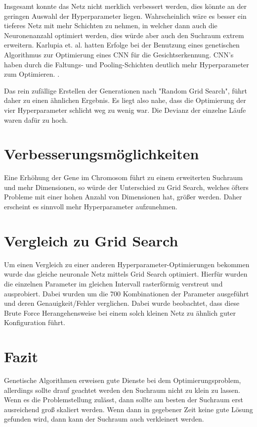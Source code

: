 Insgesamt konnte das Netz nicht merklich verbessert werden, dies könnte an der geringen Auswahl der Hyperparameter liegen. Wahrscheinlich wäre es besser ein tieferes Netz mit mehr Schichten zu nehmen, in welcher dann auch die Neuronenanzahl optimiert werden, dies würde aber auch den Suchraum extrem erweitern. Karlupia et. al. hatten Erfolge bei der Benutzung eines genetischen Algorithmus zur Optimierung eines CNN für die Gesichtserkennung. CNN's haben durch die Faltungs- und Pooling-Schichten deutlich mehr Hyperparameter zum Optimieren. \parencite{karlupia_genetic_2023}. 

Das rein zufällige Erstellen der Generationen nach "Random Grid Search", führt daher zu einen ähnlichen Ergebnis. Es liegt also nahe, dass die Optimierung der vier Hyperparameter schlicht weg zu wenig war. Die Devianz der einzelne Läufe waren dafür zu hoch.

\section{Verbesserungsmöglichkeiten}
Eine Erhöhung der Gene im Chromosom führt zu einem erweiterten Suchraum und mehr Dimensionen, so würde der Unterschied zu Grid Search, welches öfters Probleme mit einer hohen Anzahl von Dimensionen hat, größer werden. Daher erscheint es sinnvoll mehr Hyperparameter aufzunehmen. 

\section{Vergleich zu Grid Search}
Um einen Vergleich zu einer anderen Hyperparameter-Optimierungen bekommen wurde das gleiche neuronale Netz mittels Grid Search optimiert. Hierfür wurden die einzelnen Parameter im gleichen Intervall rasterförmig verstreut und ausprobiert. Dabei wurden um die 700 Kombinationen der Parameter ausgeführt und deren Genauigkeit/Fehler verglichen. Dabei wurde beobachtet, dass diese Brute Force Herangehensweise bei einem solch kleinen Netz zu ähnlich guter Konfiguration führt. 

\section{Fazit}
Genetische Algorithmen erweisen gute Dienste bei dem Optimierungsproblem, allerdings sollte drauf geachtet werden den Suchraum nicht zu klein zu lassen. Wenn es die Problemstellung zulässt, dann sollte am besten der Suchraum erst ausreichend groß skaliert werden. Wenn dann in gegebener Zeit keine gute Lösung gefunden wird, dann kann der Suchraum auch verkleinert werden. 
